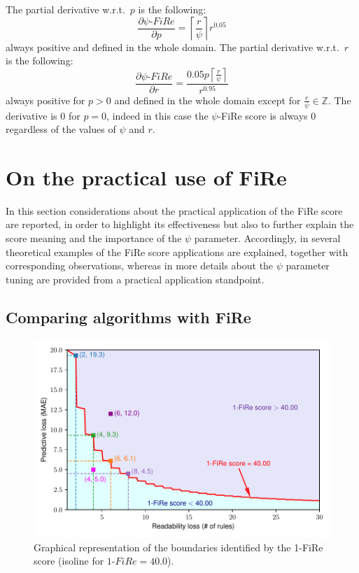 \documentclass{article}
\newcommand{\fire}{FiRe}
\newcommand{\psifire}{$\psi$-\fire}
\begin{document}
The partial derivative w.r.t.\ $p$ is the following:
%
\begin{equation}
	\frac{\partial \psi\textrm{-}\fire}{\partial p} = \left \lceil{\frac{r}{\psi}}\right \rceil r^{0.05} \label{eq:partialP}
\end{equation}
%
always positive and defined in the whole domain.
%
The partial derivative w.r.t.\ $r$ is the following:
%
\begin{equation}
	\frac{\partial \psi\textrm{-}\fire}{\partial r} = \frac{0.05 p \left \lceil{\frac{r}{\psi}}\right \rceil}{r^{0.95}}\label{eq:partialR}
\end{equation}
%
always positive for $p>0$ and defined in the whole domain except for $\frac{r}{\psi} \in \mathbb{Z}$.
%
The derivative is 0 for $p=0$, indeed in this case the \psifire{} score is always 0 regardless of the values of $\psi$ and $r$.

\section{On the practical use of \fire{}}

In this section considerations about the practical application of the \fire{} score are reported, in order to highlight its effectiveness but also to further explain the score meaning and the importance of the $\psi$ parameter.
%
Accordingly, in  several theoretical examples of the \fire{} score applications are explained, together with corresponding observations, whereas in  more details about the $\psi$ parameter tuning are provided from a practical application standpoint.

\subsection{Comparing algorithms with \fire{}}\label{ssec:comp}

\begin{figure}
	\centering
	\includegraphics[width=\linewidth]{figures/boundaries.pdf}
	\caption{Graphical representation of the boundaries identified by the 1-\fire{} score (isoline for $1\textrm{-}\fire{}=40.0$).}\label{fig:boundaries}
\end{figure}
\end{document}
